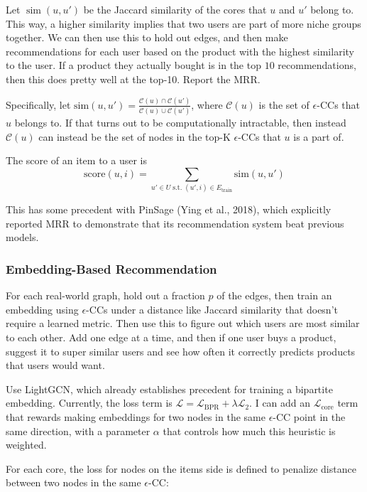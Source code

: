 \documentclass{article}
\begin{document}
Let $\operatorname{sim}(u, u')$ be the Jaccard similarity of the cores that $u$ and $u'$ belong to. This way, a higher similarity implies that two users are part of more niche groups together. We can then use this to hold out edges, and then make recommendations for each user based on the product with the highest similarity to the user. If a product they actually bought is in the top $10$ recommendations, then this does pretty well at the top-10. Report the MRR.

Specifically, let $\text{sim}(u, u') = \frac{\mathcal{C}(u) \cap \mathcal{C}(u')}{\mathcal{C}(u) \cup \mathcal{C}(u')}$, where $\mathcal{C}(u)$ is the set of $\epsilon$-CCs that $u$ belongs to. If that turns out to be computationally intractable, then instead $\mathcal{C}(u)$ can instead be the set of nodes in the top-K $\epsilon$-CCs that $u$ is a part of.

The score of an item to a user is \[\text{score}(u, i) = \sum_{u' \in U \mathrel{\text{s.t.}} (u', i) \in E_{\text{train}}}{\text{sim}(u, u')}\]

This has some precedent with PinSage (Ying et al., 2018), which explicitly reported MRR to demonstrate that its recommendation system beat previous models.

\subsubsection{Embedding-Based Recommendation}

For each real-world graph, hold out a fraction $p$ of the edges, then train an embedding using $\epsilon$-CCs under a distance like Jaccard similarity that doesn't require a learned metric. Then use this to figure out which users are most similar to each other. Add one edge at a time, and then if one user buys a product, suggest it to super similar users and see how often it correctly predicts products that users would want.

Use LightGCN, which already establishes precedent for training a bipartite embedding. Currently, the loss term is $\mathcal{L} = \mathcal{L}_{\text{BPR}} + \lambda\mathcal{L}_2$. I can add an $\mathcal{L}_{\text{core}}$ term that rewards making embeddings for two nodes in the same $\epsilon$-CC point in the same direction, with a parameter $\alpha$ that controls how much this heuristic is weighted.

For each core, the loss for nodes on the items side is defined to penalize distance between two nodes in the same $\epsilon$-CC:
\end{document}
